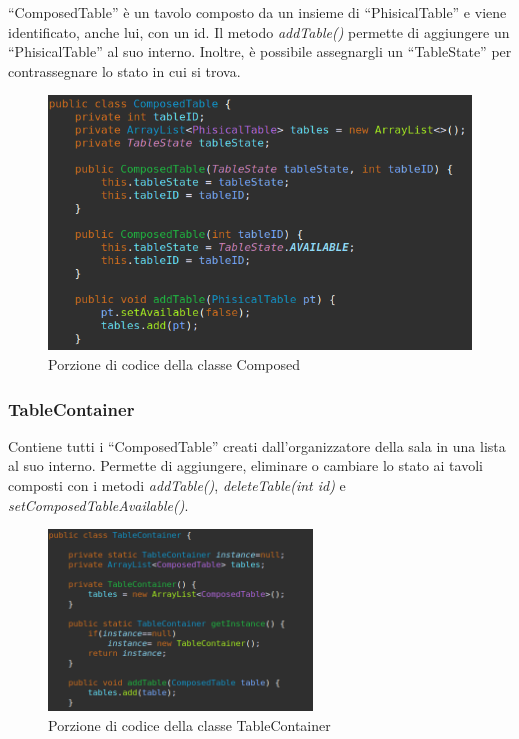 \documentclass{article}
\begin{document}
\noindent ``ComposedTable'' \`e un tavolo composto da un insieme di ``PhisicalTable'' e viene identificato, anche lui, con un id. Il metodo \textit{addTable()} permette di aggiungere un ``PhisicalTable'' al suo interno. Inoltre, \`e possibile assegnargli un ``TableState'' per contrassegnare lo stato in cui si trova.

\begin{figure}[!h]
\centering
\includegraphics[width= 12cm]{"Codice/ComposedTable.PNG"}
\caption{Porzione di codice della classe Composed}
\end{figure}

\subsubsection{TableContainer}

Contiene tutti i ``ComposedTable'' creati dall'organizzatore della sala in una lista al suo interno. Permette di aggiungere, eliminare o cambiare lo stato ai tavoli composti con i metodi \textit{addTable()}, \textit{deleteTable(int id)} e \textit{setComposedTableAvailable()}.

\begin{figure}[!h]
\centering
\includegraphics[width= 7cm]{"Codice/TableContainer1.PNG"}
\caption{Porzione di codice della classe TableContainer}
\end{figure}
\end{document}
